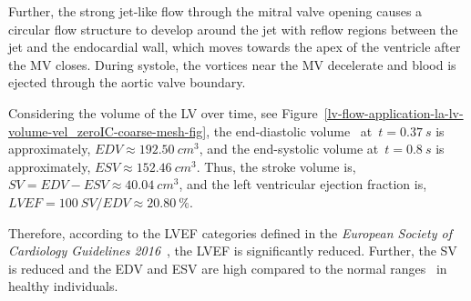 \documentclass[3p]{elsarticle}
\begin{document}
Further, the strong jet-like flow through the mitral valve opening causes a circular flow structure
to develop around the jet with reflow regions between the jet and the endocardial wall,
which moves towards the apex of the ventricle after the MV closes.
During systole, the vortices near the MV decelerate and blood is ejected through the aortic valve
boundary.

Considering the volume of the LV over time,
see Figure~\ref{lv-flow-application-la-lv-volume-vel_zeroIC-coarse-mesh-fig},
the end-diastolic volume~\cite{Holt1956} at~$t = 0.37~s$ is approximately,
$EDV \approx 192.50~cm^3$,
and the end-systolic volume at~$t = 0.8~s$ is approximately,
$ESV \approx 152.46~cm^3$.
Thus, the stroke volume is,
$SV = EDV - ESV \approx 40.04~cm^3$,
and the left ventricular ejection fraction is,
$LVEF = 100~SV / EDV \approx 20.80~\%$.

Therefore, according to the LVEF categories defined in the
\emph{European Society of Cardiology Guidelines 2016}~\cite[Section~3.2.1]{ESC2016},
the LVEF is significantly reduced.
Further, the SV is reduced and the EDV and ESV are high
compared to the normal ranges~\cite[Table~1]{LomskyJohanssonGjertssonBjoerkEdenbrandt2008}
in healthy individuals.
\end{document}
